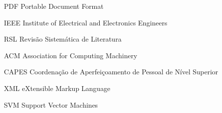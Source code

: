 \begin{siglas}
  \item[PDF] Portable Document Format
  \item[IEEE] Institute of Electrical and Electronics Engineers
  \item[RSL] Revisão Sistemática de Literatura
  \item[ACM] Association for Computing Machinery
  \item[CAPES] Coordenação de Aperfeiçoamento de Pessoal de Nível Superior
  \item[XML] eXtensible Markup Language
  \item[SVM] Support Vector Machines
\end{siglas}